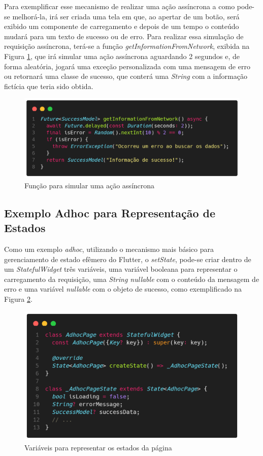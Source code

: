 \documentclass[12pt, %
openright, 
oneside, %
a4paper,    %
brazil]{facom-ufu-abntex2}
\begin{document}
Para exemplificar esse mecanismo de realizar uma ação assíncrona a como pode-se melhorá-la, irá ser criada uma tela em que, ao apertar de um botão, será exibido um componente de carregamento e depois de um tempo o conteúdo mudará para um texto de sucesso ou de erro. Para realizar essa simulação de requisição assíncrona, terá-se a função \textit{getInformationFromNetwork}, exibida na Figura \ref{fig:simulate_request}, que irá simular uma ação assíncrona aguardando 2 segundos e, de forma aleatória, jogará uma exceção personalizada com uma mensagem de erro ou retornará uma classe de sucesso, que conterá uma \textit{String} com a informação fictícia que teria sido obtida.

\begin{figure}[ht]
    \centering
    \includegraphics[width=.65\textwidth, trim={0 30 0 100}, clip]{figures/states/getInformationFromNetwork.png}
    \caption{Função para simular uma ação assíncrona}
    \label{fig:simulate_request}
\end{figure}

\subsection{Exemplo Adhoc para Representação de Estados}

Como um exemplo \textit{adhoc}, utilizando o mecanismo mais básico para gerenciamento de estado efêmero do Flutter, o \textit{setState}, pode-se criar dentro de um \textit{StatefulWidget} três variáveis, uma variável booleana para representar o carregamento da requisição, uma \textit{String nullable} com o conteúdo da mensagem de erro e uma variável \textit{nullable} com o objeto de sucesso, como exemplificado na Figura \ref{fig:variables}.

\begin{figure}[ht]
    \centering
    \includegraphics[width=.65\textwidth, trim={0 30 0 100}, clip]{figures/states/variables.png}
    \caption{Variáveis para representar os estados da página}
    \label{fig:variables}
\end{figure}
\end{document}

